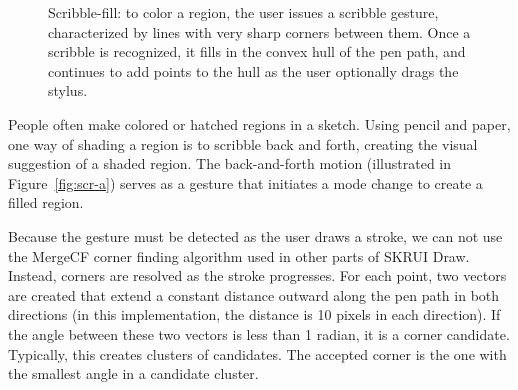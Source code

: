 \documentclass{egpubl}
\begin{document}
\begin{figure}
  \centering {}
\hspace{0.4cm} 
  \caption{Scribble-fill: to color a region, the user issues a
    scribble gesture, characterized by lines with very sharp corners
    between them. Once a scribble is recognized, it fills in the
    convex hull of the pen path, and continues to add points to the
    hull as the user optionally drags the stylus.}
  \label{fig:scr}
\end{figure}

People often make colored or hatched regions in a sketch. Using pencil
and paper, one way of shading a region is to scribble back and forth,
creating the visual suggestion of a shaded region. The back-and-forth
motion (illustrated in Figure~\ref{fig:scr-a}) serves as a gesture
that initiates a mode change to create a filled region.

Because the gesture must be detected as the user draws a stroke, we
can not use the MergeCF corner finding algorithm used in other parts
of SKRUI Draw. Instead, corners are resolved as the stroke
progresses. For each point, two vectors are created that extend a
constant distance outward along the pen path in both directions (in
this implementation, the distance is 10 pixels in each direction). If
the angle between these two vectors is less than 1 radian, it is a
corner candidate. Typically, this creates clusters of candidates. The
accepted corner is the one with the smallest angle in a candidate cluster.
\end{document}
